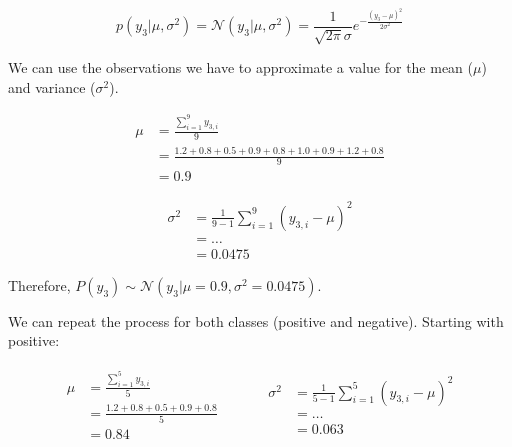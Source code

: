 \documentclass[12pt]{article}
\begin{document}
\begin{enumerate}[leftmargin=\labelsep,resume]
          \begin{equation}\label{ex2-normal}
              p\left(y_3 | \mu, \sigma^2\right)
              = \mathcal{N}\left(y_3 | \mu, \sigma^2\right)
              = \frac{1}{\sqrt{2 \pi} \sigma} e ^{- \frac{\left(y_3- \mu\right)^2}{2 \sigma^2}}
          \end{equation}

          We can use the observations we have to approximate a value for the
          mean ($\mu$) and variance ($\sigma^2$).

          $$
              \begin{aligned}
                  \mu & = \frac{\sum^{9}_{i=1} y_{3,i}}{9}                              \\
                      & = \frac{1.2 + 0.8 + 0.5 + 0.9 + 0.8 + 1.0 + 0.9 + 1.2 + 0.8}{9} \\
                      & = 0.9
              \end{aligned}
          $$

          $$
              \begin{aligned}
                  \sigma^2 & = \frac{1}{9 - 1} \sum^9_{i=1} \left(y_{3,i} - \mu\right)^2 \\
                           & = \dots                                                     \\
                           & = 0.0475
              \end{aligned}
          $$

          Therefore, $P(y_3) \sim \mathcal{N}(y_3 | \mu = 0.9, \sigma^2 = 0.0475)$.

          We can repeat the process for both classes (positive and negative).
          Starting with positive:

          $$
              \begin{array}{c|c}
                  \begin{aligned}
                      \mu & = \frac{\sum^{5}_{i=1} y_{3,i}}{5}      \\
                          & = \frac{1.2 + 0.8 + 0.5 + 0.9 + 0.8}{5} \\
                          & = 0.84
                  \end{aligned}
                  \quad &
                  \quad
                  \begin{aligned}
                      \sigma^2 & = \frac{1}{5 - 1} \sum^5_{i=1} \left(y_{3,i} - \mu\right)^2 \\
                               & = \dots                                                     \\
                               & = 0.063
                  \end{aligned}
              \end{array}
          $$


\end{enumerate}
\end{document}
